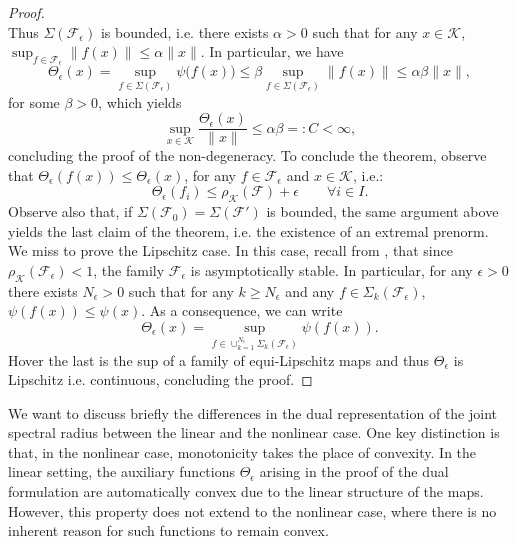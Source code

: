 \documentclass{article}
\newcommand{\family}{\mathcal{F}}
\newcommand{\cradius}{\rho_{\cone}}
\newcommand{\cone}{\mathcal{K}}
\begin{document}
\begin{proof}
\begin{equation}
        \end{equation}
        Thus $\Sigma(\family_\epsilon)$ is bounded, i.e. there exists $\alpha>0$ such that for any $x\in\cone$, $\sup_{f\in\family_{\epsilon}}\|f(x)\|\leq \alpha\|x\|$. In particular, we have 
        \begin{equation}
            \Theta_{\epsilon}(x)=\sup_{f\in \Sigma(\family_\epsilon)}\psi\big(f(x)\big)\leq \beta \sup_{f\in \Sigma(\family_\epsilon)}\|f(x)\|\leq \alpha \beta \|x\|,
        \end{equation}
        for some $\beta>0$, which yields 
        \begin{equation}
            \sup_{x\in\cone}\frac{\Theta_{\epsilon}(x)}{\|x\|}\leq \alpha\beta=:C<\infty,
        \end{equation}
        concluding the proof of the non-degeneracy.
        To conclude the theorem, observe that $
            \Theta_{\epsilon}(f(x))\leq \Theta_{\epsilon}(x)$, for any $f\in \family_{\epsilon}$ and $x\in\cone$, i.e.:
            \begin{equation}
                \Theta_\epsilon(f_i) \leq \cradius(\family)+\epsilon \qquad \forall i\in I.
            \end{equation}
          Observe also that, if $\Sigma(\family_0)=\Sigma(\family')$ is bounded, the same argument above yields the last claim of the theorem, i.e. the existence of an extremal prenorm.
          We miss to prove the Lipschitz case. In this case, recall from , that since $\cradius(\family_\epsilon)<1$, the family $\family_\epsilon$ is asymptotically stable. In particular, for any $\epsilon>0$ there exists $N_\epsilon>0$ such that for any $k\geq N_\epsilon$ and any $f\in \Sigma_k(\family_\epsilon)$, $\psi(f(x))\leq \psi(x)$. As a consequence, we can write 
          \begin{equation}
            \Theta_{\epsilon}(x)=\sup_{f\in \cup_{k=1}^{N_\epsilon}\Sigma_k(\family_{\epsilon})}\psi(f(x)).
        \end{equation}
          Hover the last is the sup of a family of equi-Lipschitz maps and thus $\Theta_\epsilon$ is Lipschitz i.e. continuous, concluding the proof.          
    \end{proof}
We want to discuss briefly the differences in the dual representation of the joint spectral radius between the linear and the nonlinear case. One key distinction is that, in the nonlinear case, monotonicity takes the place of convexity. In the linear setting, the auxiliary functions $\Theta_\epsilon$ arising in the proof of the dual formulation are automatically convex due to the linear structure of the maps. However, this property does not extend to the nonlinear case, where there is no inherent reason for such functions to remain convex.
\end{document}

